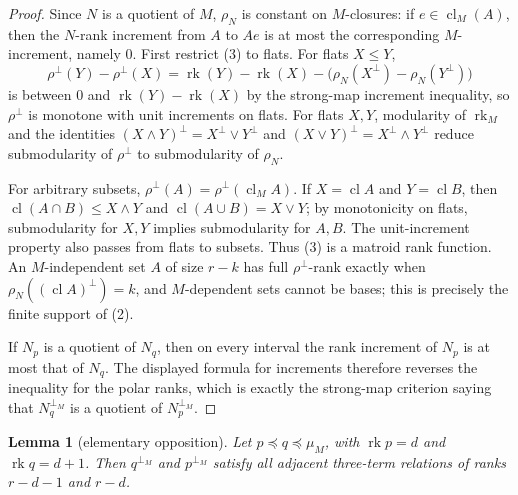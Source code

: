 \documentclass[12pt]{article}
\newcommand{\rk}{\operatorname{rk}}
\newcommand{\cl}{\operatorname{cl}}
\newtheorem{lemma}{Lemma}
\begin{document}
\begin{proof}
Since $N$ is a quotient of $M$, $\rho_N$ is constant on $M$-closures:
if $e\in\cl_M(A)$, then the $N$-rank increment from $A$ to $Ae$ is at
most the corresponding $M$-increment, namely $0$.  First restrict (3) to
flats.  For flats $X\le Y$,
\[
\rho^\perp(Y)-\rho^\perp(X)
 =\rk(Y)-\rk(X)-\bigl(\rho_N(X^\perp)-\rho_N(Y^\perp)\bigr)
\]
is between $0$ and $\rk(Y)-\rk(X)$ by the strong-map increment
inequality, so $\rho^\perp$ is monotone with unit increments on flats.
For flats $X,Y$, modularity of $\rk_M$ and the identities
$(X\wedge Y)^\perp=X^\perp\vee Y^\perp$ and
$(X\vee Y)^\perp=X^\perp\wedge Y^\perp$ reduce submodularity of
$\rho^\perp$ to submodularity of $\rho_N$.

For arbitrary subsets, $\rho^\perp(A)=\rho^\perp(\cl_M A)$.  If
$X=\cl A$ and $Y=\cl B$, then
$\cl(A\cap B)\le X\wedge Y$ and $\cl(A\cup B)=X\vee Y$; by monotonicity
on flats, submodularity for $X,Y$ implies submodularity for $A,B$.
The unit-increment property also passes from flats to subsets.  Thus
(3) is a matroid rank function.  An $M$-independent set $A$ of size
$r-k$ has full $\rho^\perp$-rank exactly when
$\rho_N((\cl A)^\perp)=k$, and $M$-dependent sets cannot be bases; this
is precisely the finite support of (2).

If $N_p$ is a quotient of $N_q$, then on every interval the rank
increment of $N_p$ is at most that of $N_q$.  The displayed formula for
increments therefore reverses the inequality for the polar ranks, which
is exactly the strong-map criterion saying that $N_q^{\perp_M}$ is a
quotient of $N_p^{\perp_M}$.
\end{proof}

\begin{lemma}[elementary opposition]\label{lem:elementary}
Let $p\preceq q\preceq\mu_M$, with $\rk p=d$ and $\rk q=d+1$.  Then
$q^{\perp_M}$ and $p^{\perp_M}$ satisfy all adjacent three-term
relations of ranks $r-d-1$ and $r-d$.
\end{lemma}
\end{document}
